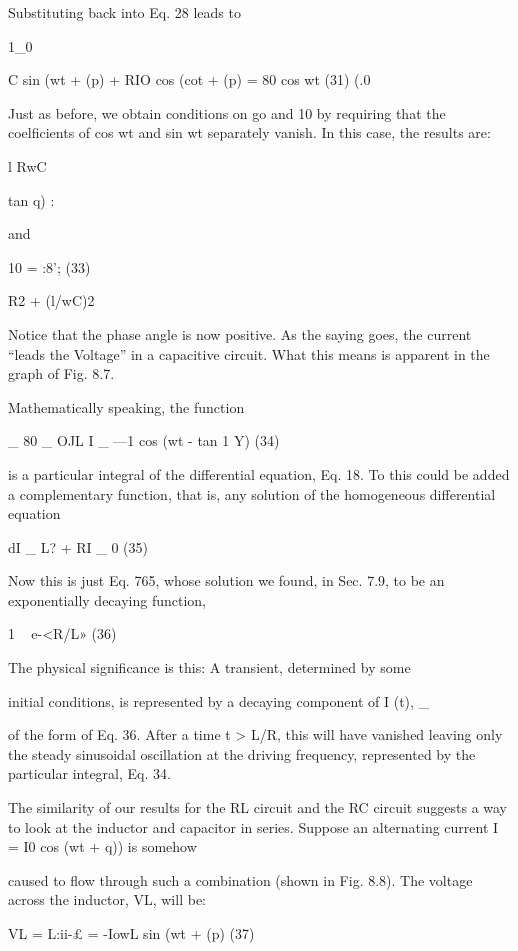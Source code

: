 Substituting back into Eq. 28 leads to

1_0

C sin (wt + (p) + RIO cos (cot + (p) = 80 cos wt (31)
(.0

Just as before, we obtain conditions on go and 10 by requiring that the
coelficients of cos wt and sin wt separately vanish. In this case, the
results are:

l
RwC

tan q) : 

and

10 = :8'; (33)

\/R2 + (l/wC)2

Notice that the phase angle is now positive. As the saying goes, the
current ``leads the Voltage'' in a capacitive circuit. What this means
is apparent in the graph of Fig. 8.7.

Mathematically speaking, the function

_ 80 _ OJL
I _ \/---1  cos (wt - tan 1 Y) (34)

is a particular integral of the differential equation, Eq. 18. To this
could be added a complementary function, that is, any solution of
the homogeneous differential equation

dI _
L? + RI _ 0 (35)

Now this is just Eq. 765, whose solution we found, in Sec. 7.9, to be
an exponentially decaying function,

1 ~ e-<R/L» (36)

The physical significance is this: A transient, determined by some

 

  

initial conditions, is represented by a decaying component of I (t), _

of the form of Eq. 36. After a time t > L/R, this will have vanished
leaving only the steady sinusoidal oscillation at the driving frequency,
represented by the particular integral, Eq. 34.

The similarity of our results for the RL circuit and the RC circuit
suggests a way to look at the inductor and capacitor in series.
Suppose an alternating current I = I0 cos (wt + q)) is somehow

 
 

caused to flow through such a combination (shown in Fig. 8.8). The
voltage across the inductor, VL, will be:

VL = L:ii-£ = -IowL sin (wt + (p) (37)

